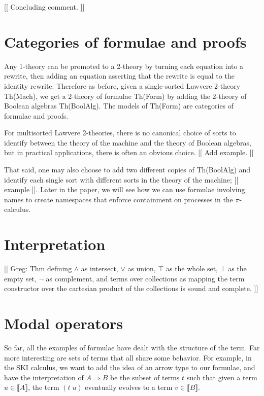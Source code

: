\documentclass{article}
\newcommand{\interp}[1]{\llbracket #1 \rrbracket}
\begin{document}
[[ Concluding comment. ]]

\section{Categories of formulae and proofs}

Any 1-theory can be promoted to a 2-theory by turning each equation into a rewrite, then adding an equation asserting that the rewrite is equal to the identity rewrite.  Therefore as before, given a single-sorted Lawvere 2-theory Th(Mach), we get a 2-theory of formulae Th(Form) by adding the 2-theory of Boolean algebras Th(BoolAlg).  The models of Th(Form) are categories of formulae and proofs.

For multisorted Lawvere 2-theories, there is no canonical choice of sorts to identify between the theory of the machine and the theory of Boolean algebras, but in practical applications, there is often an obvious choice. [[ Add example. ]]

That said, one may also choose to add two different copies of Th(BoolAlg) and identify each single sort with different sorts in the theory of the machine; [[ example ]].  Later in the paper, we will see how we can use formulae involving names to create namespaces that enforce containment on processes in the $\pi$-calculus.

\section{Interpretation}

[[ Greg: Thm defining $\land$ as intersect, $\lor$ as union, $\top$ as the whole set, $\bot$ as the empty set, $\neg$ as complement, and terms over collections as mapping the term constructor over the cartesian product of the collections is sound and complete. ]]

\section{Modal operators}

So far, all the examples of formulae have dealt with the structure of the term.  Far more interesting are sets of terms that all share some behavior.  For example, in the SKI calculus, we want to add the idea of an arrow type to our formulae, and have the interpretation of $A \Rightarrow B$ be the subset of terms $t$ such that given a term $u\in\interp{A}$, the term $(t\; u)$ eventually evolves to a term $v\in\interp{B}.$
\end{document}
